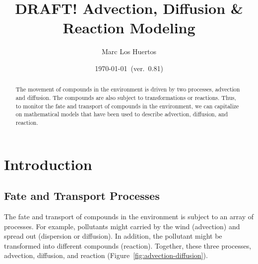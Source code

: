 \documentclass{tufte-handout}\usepackage[]{graphicx}\usepackage[]{xcolor}
\title{DRAFT! Advection, Diffusion \& Reaction Modeling}
\author{Marc Los Huertos}
\date{\today~(ver.~0.81)}
\begin{document}
\maketitle%
\begin{abstract}
The movement of compounds in the environment is driven by two processes, advection and diffusion. The compounds are also subject to transformations or reactions. Thus, to monitor the fate and transport of compounds in the environment, we can capitalize on mathematical models that have been used to describe advection, diffusion, and reaction. %

\end{abstract}

\section{Introduction}

\subsection{Fate and Transport Processes}

The fate and transport of compounds in the environment is subject to an array of processes. For example, pollutants might carried by the wind (advection) and spread out (dispersion or diffusion). In addition, the pollutant might be transformed into different compounds (reaction). Together, these three processes, advection, diffusion, and reaction (Figure~\ref{fig:advection-diffusion}).%

\end{document}
